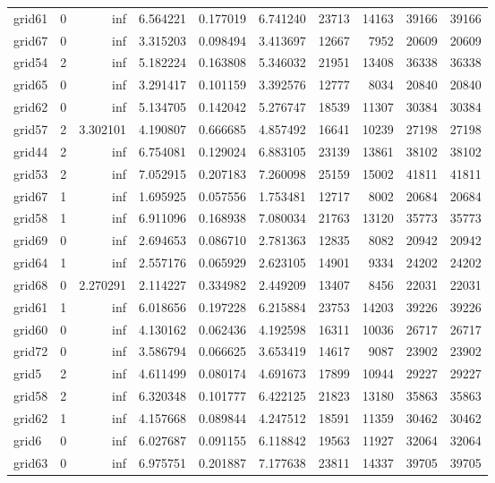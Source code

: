 \begin{longtable}{|l|r|r|r|r|r|r|r|r|r|}
grid61 & 0 & inf & 6.564221 & 0.177019 & 6.741240 & 23713 & 14163 & 39166 & 39166 \\
grid67 & 0 & inf & 3.315203 & 0.098494 & 3.413697 & 12667 & 7952 & 20609 & 20609 \\
grid54 & 2 & inf & 5.182224 & 0.163808 & 5.346032 & 21951 & 13408 & 36338 & 36338 \\
grid65 & 0 & inf & 3.291417 & 0.101159 & 3.392576 & 12777 & 8034 & 20840 & 20840 \\
grid62 & 0 & inf & 5.134705 & 0.142042 & 5.276747 & 18539 & 11307 & 30384 & 30384 \\
grid57 & 2 & 3.302101 & 4.190807 & 0.666685 & 4.857492 & 16641 & 10239 & 27198 & 27198 \\
grid44 & 2 & inf & 6.754081 & 0.129024 & 6.883105 & 23139 & 13861 & 38102 & 38102 \\
grid53 & 2 & inf & 7.052915 & 0.207183 & 7.260098 & 25159 & 15002 & 41811 & 41811 \\
grid67 & 1 & inf & 1.695925 & 0.057556 & 1.753481 & 12717 & 8002 & 20684 & 20684 \\
grid58 & 1 & inf & 6.911096 & 0.168938 & 7.080034 & 21763 & 13120 & 35773 & 35773 \\
grid69 & 0 & inf & 2.694653 & 0.086710 & 2.781363 & 12835 & 8082 & 20942 & 20942 \\
grid64 & 1 & inf & 2.557176 & 0.065929 & 2.623105 & 14901 & 9334 & 24202 & 24202 \\
grid68 & 0 & 2.270291 & 2.114227 & 0.334982 & 2.449209 & 13407 & 8456 & 22031 & 22031 \\
grid61 & 1 & inf & 6.018656 & 0.197228 & 6.215884 & 23753 & 14203 & 39226 & 39226 \\
grid60 & 0 & inf & 4.130162 & 0.062436 & 4.192598 & 16311 & 10036 & 26717 & 26717 \\
grid72 & 0 & inf & 3.586794 & 0.066625 & 3.653419 & 14617 & 9087 & 23902 & 23902 \\
grid5 & 2 & inf & 4.611499 & 0.080174 & 4.691673 & 17899 & 10944 & 29227 & 29227 \\
grid58 & 2 & inf & 6.320348 & 0.101777 & 6.422125 & 21823 & 13180 & 35863 & 35863 \\
grid62 & 1 & inf & 4.157668 & 0.089844 & 4.247512 & 18591 & 11359 & 30462 & 30462 \\
grid6 & 0 & inf & 6.027687 & 0.091155 & 6.118842 & 19563 & 11927 & 32064 & 32064 \\
grid63 & 0 & inf & 6.975751 & 0.201887 & 7.177638 & 23811 & 14337 & 39705 & 39705 \\

\end{longtable}
